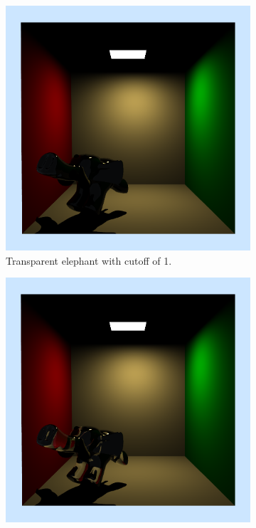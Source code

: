  \begin{figure}[h]
	\centering
	
	\begin{subfigure}[b]{0.3\textwidth}
		\includegraphics[width=\textwidth]{week3/elephant_1_9rpp.png}
		\caption{Transparent elephant with cutoff of 1.}
	\end{subfigure}
	\begin{subfigure}[b]{0.3\textwidth}
		\includegraphics[width=\textwidth]{week3/elephant_2_9rpp.png}

\end{subfigure}
\end{figure}
